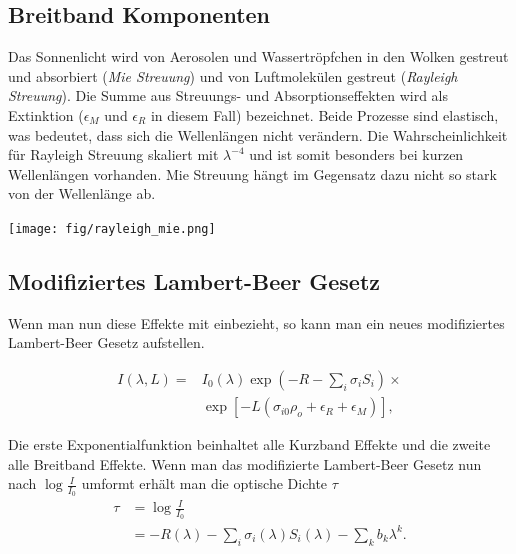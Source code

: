\documentclass[12pt, a4paper, bibliography=totoc]{scrartcl}
\begin{document}
\begin{multicols}{2}
\subsection{Breitband Komponenten}

Das Sonnenlicht wird von Aerosolen und Wassertröpfchen in den Wolken gestreut und absorbiert (\textit{Mie Streuung}) und von Luftmolekülen gestreut (\textit{Rayleigh Streuung}).
Die Summe aus Streuungs- und Absorptionseffekten wird als Extinktion ($\epsilon_M$ und $\epsilon_R$ in diesem Fall) bezeichnet.
Beide Prozesse sind elastisch, was bedeutet, dass sich die Wellenlängen nicht verändern.
Die Wahrscheinlichkeit für Rayleigh Streuung skaliert mit $\lambda^{-4}$ und ist somit besonders bei kurzen Wellenlängen vorhanden.
Mie Streuung hängt im Gegensatz dazu nicht so stark von der Wellenlänge ab.

\begin{center}
    \texttt{[image: fig/rayleigh\_mie.png]}
    \label{fig:rayleigh_mie}
\end{center}



\subsection{Modifiziertes Lambert-Beer Gesetz}\label{ssec:mod_lamb-beer_law}

Wenn man nun diese Effekte mit einbezieht, so kann man ein neues modifiziertes Lambert-Beer Gesetz aufstellen.

\begin{align*}
    I(\lambda, L) = & I_0 (\lambda) \exp \left( -R - \sum_i \sigma_i
    S_i \right) \times \\
    & \exp \left[ - L \left( \sigma_{i0} \rho_o + \epsilon_R + \epsilon_M \right) \right], \label{eq:mod_lambert_beer_law}
\end{align*}

Die erste Exponentialfunktion beinhaltet alle Kurzband Effekte und die zweite alle Breitband Effekte.
Wenn man das modifizierte Lambert-Beer Gesetz nun nach $\log \frac{I}{I_0}$ umformt erhält man die optische Dichte $\tau$
\begin{align}
\tau &= \log \frac{I}{I_0} \\
    &= - R(\lambda) - \sum_i \sigma_i (\lambda) S_i (\lambda) - \sum_k b_k \lambda^k.\label{eq:optical_density}
\end{align}


\end{multicols}
\end{document}
